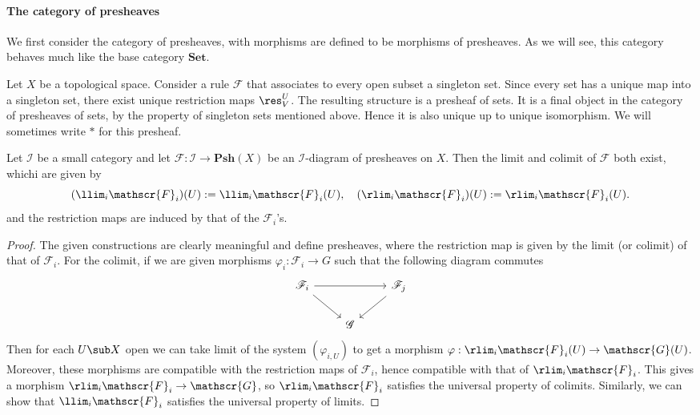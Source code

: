 \paragraph{The category of presheaves} We first consider the category of presheaves, with morphisms are defined to be morphisms of presheaves. As we will see, this category behaves much like the base category $\mathbf{Set}$.
\begin{example}
Let $X$ be a topological space. Consider a rule $\mathscr{F}$ that associates to every open subset a singleton set. Since every set has a unique map into a
singleton set, there exist unique restriction maps $\res^U_V$. The resulting structure is a presheaf of sets. It is a final object in the category of presheaves of sets, by the property of singleton sets mentioned above. Hence it is also unique up to unique isomorphism. We will sometimes write $\ast$ for this presheaf.
\end{example}
\begin{proposition}
Let $\mathcal{I}$ be a small category and let $\mathscr{F}:\mathcal{I}\to\mathbf{Psh}(X)$ be an $\mathcal{I}$-diagram of presheaves on $X$. Then the limit and colimit of $\mathscr{F}$ both exist, whichi are given by
\[(\llim_i\mathscr{F}_i)(U):=\llim_i\mathscr{F}_i(U),\quad (\rlim_i\mathscr{F}_i)(U):=\rlim_i\mathscr{F}_i(U).\]
and the restriction maps are induced by that of the $\mathscr{F}_i$'s.
\end{proposition}
\begin{proof}
The given constructions are clearly meaningful and define presheaves, where the restriction map is given by the limit (or colimit) of that of $\mathscr{F}_i$. For the colimit, if we are given morphisms $\varphi_i:\mathscr{F}_i\to G$ such that the following diagram commutes
\[\begin{tikzcd}
\mathscr{F}_i\ar[rr]\ar[rd]&&\mathscr{F}_j\ar[ld]\\
&\mathscr{G}&
\end{tikzcd}\]
Then for each $U\sub X$ open we can take limit of the system $(\varphi_{i,U})$ to get a morphism $\varphi:\rlim_i\mathscr{F}_i(U)\to\mathscr{G}(U)$. Moreover, these morphisms are compatible with the restriction maps of $\mathscr{F}_i$, hence compatible with that of $\rlim_i\mathscr{F}_i$. This gives a morphism $\rlim_i\mathscr{F}_i\to\mathscr{G}$, so $\rlim_i\mathscr{F}_i$ satisfies the universal property of colimits. Similarly, we can show that $\llim_i\mathscr{F}_i$ satisfies the universal property of limits.
\end{proof}
